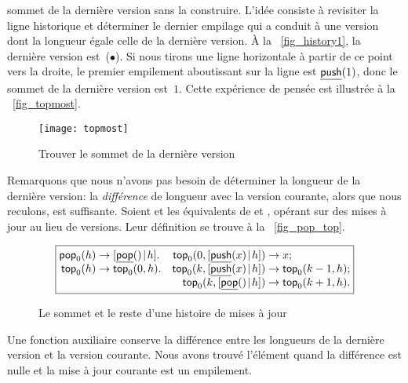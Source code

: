 sommet de la dernière version sans la construire. L'idée consiste à
revisiter la ligne historique et déterminer le dernier empilage qui a
conduit à une version dont la longueur égale celle de la dernière
version. À la \fig~\ref{fig_history1}, la dernière version
est~(\(\bullet\)). Si nous tirons une ligne horizontale à partir de ce
point vers la droite, le premier empilement aboutissant sur la ligne
est \(\underline{\textsf{push}}(1)\), donc le sommet de la dernière version
est~\(1\). Cette expérience de pensée est illustrée à la
\fig~\vref{fig_topmost}.
\begin{figure}[b]
\centering
\texttt{[image: topmost]}
\caption{Trouver le sommet de la dernière version
\label{fig_topmost}}
\end{figure}
Remarquons que nous n'avons pas besoin de déterminer la longueur de la
dernière version: la \emph{différence} de longueur avec la version courante, alors que nous reculons, est suffisante. Soient
 et
 les équivalents de
 et , opérant sur des mises à jour au lieu de versions. Leur définition se trouve à la \fig~\vref{fig_pop_top}.
\begin{figure}[t]
\begin{equation*}
\boxed{%
\begin{array}{@{}r@{\;}l@{\;}lr@{\;}l@{\;}l@{}}
\fun{pop}_0(h)   & \rightarrow          & \cons{\ufun{pop}()}{h}. &
\fun{top}_0(0,\cons{\ufun{push}(x)}{h}) & \rightarrow             & x;\\
\fun{top}_0(h)   & \rightarrow          & \fun{top}_0(0,h).       &
\fun{top}_0(k,\cons{\ufun{push}(x)}{h}) & \rightarrow             & \fun{top}_0(k-1,h);\\
                 & & &
\fun{top}_0(k,\cons{\ufun{pop}()}{h})   & \rightarrow            & \fun{top}_0(k+1,h).
\end{array}}
\end{equation*}
\caption{Le sommet et le reste d'une histoire de mises à jour
\label{fig_pop_top}}
\end{figure}
Une fonction auxiliaire
 conserve la différence
entre les longueurs de la dernière version et la version
courante. Nous avons trouvé l'élément quand la différence est nulle et
la mise à jour courante est un empilement.

